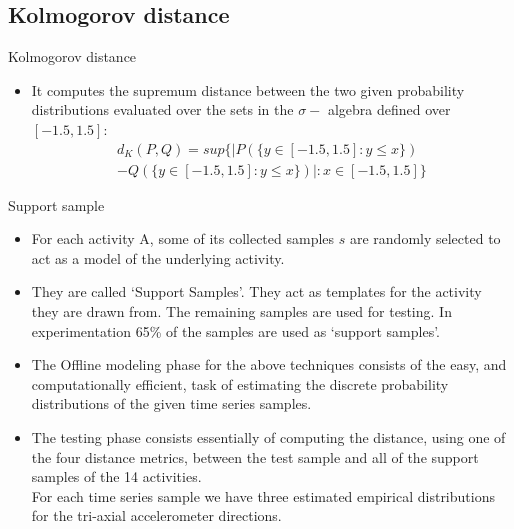 \documentclass{beamer}
\begin{document}
\subsection{Kolmogorov distance}
\begin{frame}{Kolmogorov distance}
    \begin{itemize}
        \item It computes the supremum distance between the two given probability distributions evaluated over the sets in the $\sigma - $ algebra defined over $[-1.5,1.5]$:
        \begin{equation}
            \begin{split}
                d_K(P,Q) = sup\{\big | P(\{y \in [-1.5, 1.5]: y \leq x \}) \\
                - Q(\{y \in [-1.5, 1.5]: y \leq x \})\big |: x \in [-1.5, 1.5]\}
            \end{split}
        \end{equation}
    \end{itemize}
\end{frame}
\begin{frame}{Support sample}
    \begin{itemize}
        \item For each activity A, some of its collected samples $s$ are randomly selected to act as a model of the underlying activity.
        \item They are called ‘Support Samples’. They act as templates for the activity they are drawn from. The remaining samples are used for testing. In experimentation 65\% of the samples are used as ‘support samples’.
        \item The Offline modeling phase for the above techniques consists of the easy, and computationally efficient, task of estimating the discrete probability distributions of the given time series samples.\\
        \item The testing phase consists essentially of computing the distance, using one of the four distance metrics, between the test sample and all of the support samples of the 14 activities.\\For each time series sample we have three estimated empirical distributions for the tri-axial accelerometer directions.
    \end{itemize}
\end{frame}
\end{document}
